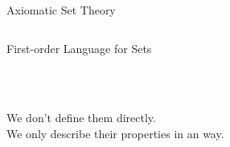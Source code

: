 
\begin{frame}{}
  \begin{center}
    {\Large Axiomatic Set Theory }
  \end{center}

  \vspace{0.80cm}
  \begin{columns}
  \end{columns}
\end{frame}

\begin{frame}{}
  \begin{center}
    {\Large First-order Language for Sets \red{$\lset{} = \set{\in}$}}
  \end{center}

  \begin{columns}
      \begin{description}[Connectives:]
        \item[Parentheses:]
        \item[Variables:]
        \item[Connectives:]
        \item[Quantifiers:]
        \vspace{0.50cm}
        \item[Constants:]
        \item[Functions:]
        \item[Predicates:] \red{$\in$}
      \end{description}
  \end{columns}
\end{frame}

\begin{frame}{}
  \begin{center}
     \\[10pt]
     \\[40pt]

    \pause
    We don't define them directly. \\[10pt]
    We only describe their properties in an  way.
  \end{center}
\end{frame}

